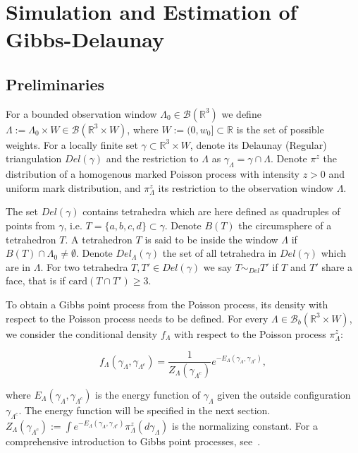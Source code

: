 \documentclass[12pt,a4paper]{report}
\begin{document}
\chapter{Simulation and Estimation of Gibbs-Delaunay}


\section{Preliminaries}
For a bounded observation window $\Lambda_0 \in\mathcal B(\mathbb R^3)$ we  define  $\Lambda := \Lambda_0 \times W \in \mathcal B(\mathbb R^3 \times W)$, where  $W:=(0,w_0]\subset \mathbb R$ is the set of possible weights. For a locally finite set $\gamma\subset \mathbb R^3\times W $, denote its Delaunay (Regular) triangulation $Del(\gamma)$ and the restriction to $\Lambda$ as  $\gamma_\Lambda = \gamma \cap \Lambda$. Denote $\pi^z$ the distribution of a homogenous marked Poisson process with intensity $z>0$ and uniform mark distribution, and $\pi^z_\Lambda$ its restriction to the observation window $\Lambda$. 

The set $Del(\gamma)$ contains tetrahedra which are here defined as quadruples of points from $\gamma$, i.e. $T=\{a,b,c,d\}\subset \gamma$. Denote $B(T)$ the circumsphere of a tetrahedron $T$. A tetrahedron $T$ is said to be inside the window $\Lambda$ if $B(T)\cap \Lambda_0 \neq \emptyset$. Denote $Del_\Lambda(\gamma)$ the set of all tetrahedra in $Del(\gamma)$ which are in $\Lambda$. For two tetrahedra $T,T'\in Del(\gamma)$ we say $T\sim_{Del} T'$ if $T$ and $T'$ share a face, that is if $\text{card}(T\cap T') \geq 3$. 

To obtain a Gibbs point process from the Poisson process, its density with respect to the Poisson process needs to be defined. For every $\Lambda \in \mathcal B_b(\mathbb R^3\times W)$, we consider the conditional density $f_\Lambda$ with respect to the Poisson process $\pi^z_\Lambda$:

$$ f_\Lambda(\gamma_\Lambda, \gamma_{\Lambda^c}) = \frac 1{Z_\Lambda(\gamma_{\Lambda^c})} e^{-E_\Lambda (\gamma_\Lambda, \gamma_{\Lambda^c})},$$ 

where $E_\Lambda(\gamma_\Lambda, \gamma_{\Lambda^c})$ is the energy function of $\gamma_\Lambda$ given the outside configuration $\gamma_{\Lambda^c}$. The energy function will be specified in the next section. $Z_\Lambda(\gamma_{\Lambda^c}) := \int e^{-E_\Lambda(\gamma_\Lambda, \gamma_{\Lambda^c})} \pi^z_\Lambda(d\gamma_\Lambda)$ is the normalizing constant.
For a comprehensive introduction to Gibbs point processes, see~\cite{dereudre2017}.
\end{document}
